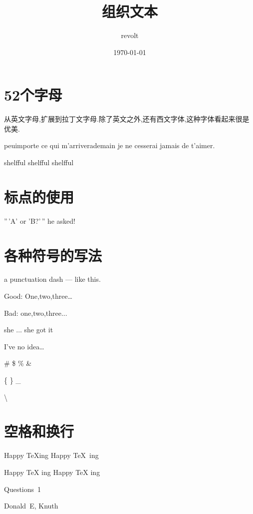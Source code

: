 \documentclass[UTF8]{ctexart}
\title{组织文本}
\author{revolt}
\date{\today}
\begin{document}
\maketitle
\tableofcontents

\section{52个字母}

从英文字母,扩展到拉丁文字母.除了英文之外,还有西文字体,这种字体看起来很是优美.


peu\quad importe ce qui m'arrivera\qquad demain je ne cesserai jamais de t'aimer. 

shelfful shelf{}ful shelf\/ful

\section{标点的使用}

''\,'A' or 'B?'\,'' he asked! %

\section{各种符号的写法}

a punctuation dash --- like this.

Good: One,two,three\ldots

Bad: one,two,three...

she $\ldots$ she got it

I've no idea\ldots

\# \quad \$ \quad \% \quad \& \quad

\{ \quad \} \quad \_ \quad

\textbackslash %


\section{空格和换行}

Happy \TeX ing Happy \TeX\ ing

Happy \TeX{} ing Happy {\TeX} ing


Questions~1 %

Donald~E, Knuth %
\end{document}

